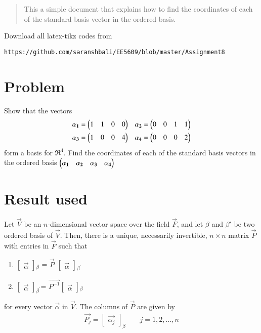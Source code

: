 \documentclass[journal,12pt,twocolumn]{IEEEtran}
\begin{document}
%
\begin{abstract}
This a simple document that explains how to find the coordinates of each of the standard basis vector in the ordered basis.
\end{abstract}
%
%
Download all latex-tikz codes from 
%
\begin{lstlisting}
https://github.com/saranshbali/EE5609/blob/master/Assignment8
\end{lstlisting}
%
\section{Problem}
Show that the vectors 
\begin{align}
& \mathbf{\alpha_1} = \begin{pmatrix}1 & 1 & 0 & 0\end{pmatrix} & \mathbf{\alpha_2} = \begin{pmatrix}0 & 0 & 1 & 1\end{pmatrix} \\
& \mathbf{\alpha_3} = \begin{pmatrix}1 & 0 & 0 & 4\end{pmatrix} & \mathbf{\alpha_4} = \begin{pmatrix}0 & 0 & 0 & 2\end{pmatrix}
\end{align}
form a basis for $\Re^4$. Find the coordinates of each of the standard basis vectors
in the ordered basis $\begin{pmatrix}\mathbf{\alpha_1} &  \mathbf{\alpha_2} & \mathbf{\alpha_3} & \mathbf{\alpha_4}\end{pmatrix}$
\section{Result used}
\begin{theorem} \label{1}
Let $\vec{V}$ be an $n$-dimensional vector space over the field $\vec{F}$, and let $\beta$ and $\beta'$ be two ordered basis of $\vec{V}$. Then, there is a unique, necessarily invertible, $n\times n$ matrix $\vec{P}$ with entries in $\vec{F}$ such that 
\begin{enumerate}
	\item $\begin{bmatrix}
	\vec{\alpha}
	\end{bmatrix}$$_\beta$ = $\vec{P}$  $\begin{bmatrix}
	\vec{\alpha} 
\end{bmatrix}$$_{\beta^{'}}$
    \item $\begin{bmatrix}
    	\vec{\alpha}
    \end{bmatrix}$$_{\beta^{'}}$= $\vec{P^{-1}}$$\begin{bmatrix}
    \vec{\alpha}	
\end{bmatrix}$$_\beta$
\end{enumerate}
for every vector $\vec{\alpha}$ in $\vec{V}$. The columns of $\vec{P}$ are given by
\begin{align}
\vec{P_j} =  \begin{bmatrix}
	\vec{\alpha_j}
\end{bmatrix}_{\beta}	\qquad j = 1,2,...,n
\end{align}
\end{theorem}
\end{document}
